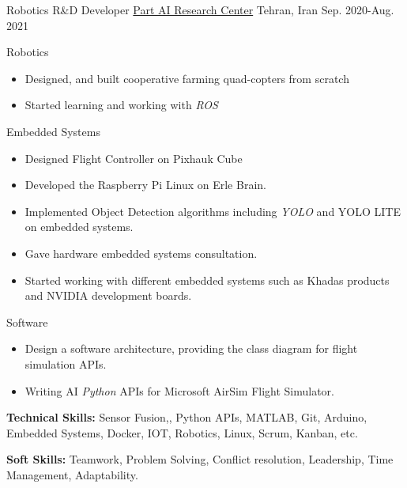 \begin{cventries}
  \cventry
{Robotics R\&D Developer}  %
    {\href{https://ir.linkedin.com/company/partdp-ai}{Part AI Research Center}} %
    {Tehran, Iran} %
    {Sep. 2020-Aug. 2021} %
    {
      \begin{cvitems} %
                \item{Robotics}
        \begin{itemize}[label= - ]
            \item {Designed, and built cooperative farming quad-copters from scratch}
             \item {Started learning and working with \textit{ROS}}
        \end{itemize}
        \item{Embedded Systems}
        \begin{itemize}[label=-]
            \item {Designed Flight Controller on Pixhauk Cube}
            \item {Developed the Raspberry Pi Linux on Erle Brain.}
            \item {Implemented Object Detection algorithms including \textit{YOLO} and YOLO LITE on embedded systems.}
            \item {Gave hardware embedded systems consultation.}
            \item {Started working with different embedded systems such as Khadas products and NVIDIA development boards.}
        \end{itemize}
        \item{Software}
        \begin{itemize}[label = -]
        \item {Design a software architecture, providing the class diagram for flight simulation APIs.}
            \item {Writing AI \textit{Python} APIs for Microsoft AirSim Flight Simulator.}
        \end{itemize}
        \item {\textbf{Technical Skills:} Sensor Fusion,, Python APIs, MATLAB, Git, Arduino, Embedded Systems, Docker, IOT, Robotics, Linux, Scrum, Kanban, etc.}
        \item {\textbf{Soft Skills:} Teamwork, Problem Solving, Conflict resolution, Leadership, Time Management, Adaptability.}
      \end{cvitems}
    } 


\end{cventries}
